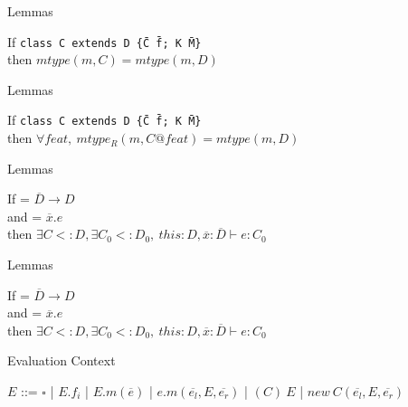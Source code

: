 \documentclass{beamer}
\newcommand{\cdecl}[6]{\texttt{class #1 extends #2 \{\={#3} \={#4}; #5 \={#6}\}}}
\begin{document}
    \begin{frame}{Lemmas}
        \begin{lemma}
            If \cdecl{C}{D}{C}{f}{K}{M} \\
            then $mtype(m, C) = mtype(m, D)$        
        \end{lemma}
    \end{frame}


    \begin{frame}{Lemmas}
        \begin{lemma}
            If \cdecl{C}{D}{C}{f}{K}{M} \\
            then $\forall feat,~mtype_R(m, C@feat) = mtype(m, D)$        
        \end{lemma}
    \end{frame}

    \begin{frame}{Lemmas}
        \begin{lemma}
            If  = $\overline{D} \rightarrow D$ \\
            and  = $\overline{x}.e$\\
            then $\exists C <: D, \exists C_0 <: D_0,~this: D, \overline{x}: \overline{D}\vdash e: C_0$
        \end{lemma}
    \end{frame}



    \begin{frame}{Lemmas}
        \begin{lemma}
            If  = $\overline{D} \rightarrow D$ \\
            and  = $\overline{x}.e$\\
            then $\exists C <: D, \exists C_0 <: D_0,~this: D, \overline{x}: \overline{D}\vdash e: C_0$
        \end{lemma}
    \end{frame}



    \begin{frame}{Evaluation Context}
        \centering
        \begin{table}[h]
            $E$ ::= $\square$ | $E.f_i$ | $E.m(\overline{e})$ | $e.m(\overline{e_l}, E, \overline{e_r})$
            | $(C)~E$ | $new~C(\overline{e_l}, E, \overline{e_r})$
            \label{table:eval-ctx}
            \caption{Evaluation Context}
        \end{table}         
    \end{frame}
\end{document}
